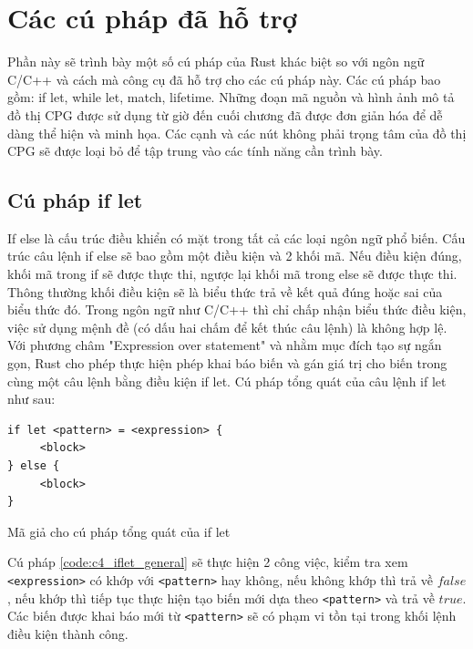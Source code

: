 \section{Các cú pháp đã hỗ trợ}

Phần này sẽ trình bày một số cú pháp của Rust khác biệt so với ngôn ngữ C/C++ và cách mà công cụ đã hỗ trợ cho các cú pháp này.
Các cú pháp bao gồm: if let, while let, match, lifetime.
Những đoạn mã nguồn và hình ảnh mô tả đồ thị CPG được sử dụng từ giờ đến cuối chương đã được đơn giản hóa để dễ dàng thể hiện và minh họa.
Các cạnh và các nút không phải trọng tâm của đồ thị CPG sẽ được loại bỏ để tập trung vào các tính năng cần trình bày.

\subsection{Cú pháp if let}
If else là cấu trúc điều khiển có mặt trong tất cả các loại ngôn ngữ phổ biến.
Cấu trúc câu lệnh if else sẽ bao gồm một điều kiện và 2 khối mã.
Nếu điều kiện đúng, khối mã trong if sẽ được thực thi, ngược lại khối mã trong else sẽ được thực thi.
Thông thường khối điều kiện sẽ là biểu thức trả về kết quả đúng hoặc sai của biểu thức đó.
Trong ngôn ngữ như C/C++ thì chỉ chấp nhận biểu thức điều kiện, việc sử dụng mệnh đề (có dấu hai chấm để kết thúc câu lệnh) là không hợp lệ.
Với phương châm "Expression over statement" và nhằm mục đích tạo sự ngắn gọn, Rust cho phép thực hiện phép khai báo biến và gán giá trị cho biến trong cùng một câu lệnh bằng điều kiện if let.
Cú pháp tổng quát của câu lệnh if let như sau:

\begin{listing}[H]
\begin{verbatim}
if let <pattern> = <expression> {
     <block>
} else {
     <block>
}
\end{verbatim}
\caption{Mã giả cho cú pháp tổng quát của if let}
\label{code:c4_iflet_general}
\end{listing}

Cú pháp \ref{code:c4_iflet_general} sẽ thực hiện 2 công việc, kiểm tra xem \texttt{<expression>} có khớp với \texttt{<pattern>} hay không, nếu không khớp thì trả về $false$, nếu khớp thì tiếp tục thực hiện tạo biến mới dựa theo \texttt{<pattern>} và trả về $true$.
Các biến được khai báo mới từ \texttt{<pattern>} sẽ có phạm vi tồn tại trong khối lệnh điều kiện thành công.


